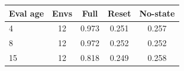 \begin{tabular}{lcccc}
\toprule
Eval age & Envs & Full & Reset & No-state\\
\midrule
4 & 12 & 0.973 & 0.251 & 0.257\\
8 & 12 & 0.972 & 0.252 & 0.252\\
15 & 12 & 0.818 & 0.249 & 0.258\\
\bottomrule
\end{tabular}
